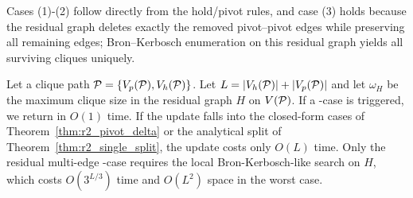 


% 
Cases (1)-(2) follow directly from the hold/pivot rules, and case (3) holds because the residual graph deletes exactly the removed pivot--pivot edges while preserving all remaining edges; Bron--Kerbosch enumeration on this residual graph yields all surviving cliques uniquely.




Let a clique path $\TPath = \{V_p(\TPath), V_h(\TPath)\}$.
Let $L=|V_h(\TPath)|+|V_p(\TPath)|$ and let $\omega_H$ be the maximum clique size in the residual graph $H$ on $V(\TPath)$.
If a \hold-\hold case is triggered, we return in $O(1)$ time.
If the update falls into the closed-form cases of Theorem~\ref{thm:r2_pivot_delta} or the analytical split of Theorem~\ref{thm:r2_single_split}, the update costs only $O(L)$ time.
Only the residual multi-edge \pivot-\pivot case requires the local Bron-Kerbosch-like search on $H$, which costs $O(3^{L/3})$ time and $O(L^2)$ space in the worst case.
